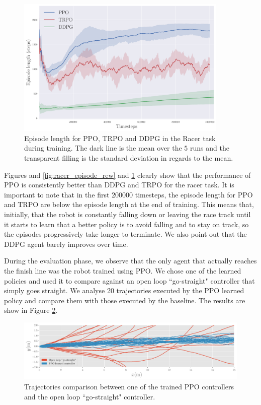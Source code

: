 \begin{figure}[ht]
	\centering
	\includegraphics[width=0.9\textwidth]{Chapter7/episode_length.pdf}
	\caption{Episode length for PPO, TRPO and DDPG in the Racer task during training.
	The dark line is the mean over the $5$ runs and the transparent filling is
	the standard deviation in regards to the mean.}
	\label{fig:racer_episode_len}
\end{figure}

Figures and \ref{fig:racer_episode_rew} and \ref{fig:racer_episode_len} clearly show that 
the performance of PPO is consistently better than DDPG and TRPO for the racer task.
It is important to note that in the first $200000$ timesteps, the episode length for PPO and
TRPO are below the episode length at the end of training.
This means that, initially, that the robot is constantly falling down or leaving the race track until
it starts to learn that a better policy is to avoid falling and to stay on track, so the episodes
progressively take longer to terminate.
We also point out that the DDPG agent barely improves over time.

During the evaluation phase, we observe that the only agent that actually reaches the finish line was the 
robot trained using PPO. 
We chose one of the learned policies and used it to compare against an open loop ``go-straight" controller
that simply goes straight.
We analyse 20 trajectories executed by the PPO learned policy and compare them with those executed by the baseline.
The results are show in Figure \ref{fig:trajectory}.

\begin{figure}[b]
	\centering
	\includegraphics[width=1\textwidth]{Chapter7/trajectory.pdf}
	\caption{Trajectories comparison between one of the trained PPO controllers and the open loop ``go-straight" controller.}
	\label{fig:trajectory}
\end{figure}

